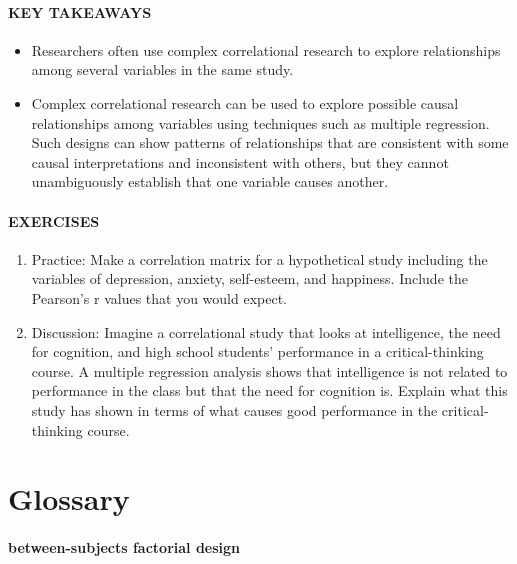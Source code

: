 \documentclass[
]{krantz}
\providecommand{\tightlist}{%
  \setlength{\itemsep}{0pt}\setlength{\parskip}{0pt}}
\begin{document}
\hypertarget{key-takeaways-21}{%
\paragraph*{KEY TAKEAWAYS}\label{key-takeaways-21}}

\begin{itemize}
\tightlist
\item
  Researchers often use complex correlational research to explore relationships among several variables in the same study.
\item
  Complex correlational research can be used to explore possible causal relationships among variables using techniques such as multiple regression. Such designs can show patterns of relationships that are consistent with some causal interpretations and inconsistent with others, but they cannot unambiguously establish that one variable causes another.
\end{itemize}

\hypertarget{exercises-19}{%
\paragraph*{EXERCISES}\label{exercises-19}}

\begin{enumerate}
\def\labelenumi{\arabic{enumi}.}
\tightlist
\item
  Practice: Make a correlation matrix for a hypothetical study including the variables of depression, anxiety, self-esteem, and happiness. Include the Pearson's r values that you would expect.
\item
  Discussion: Imagine a correlational study that looks at intelligence, the need for cognition, and high school students' performance in a critical-thinking course. A multiple regression analysis shows that intelligence is not related to performance in the class but that the need for cognition is. Explain what this study has shown in terms of what causes good performance in the critical-thinking course.
\end{enumerate}

\hypertarget{glossary-7}{%
\section{Glossary}\label{glossary-7}}

\hypertarget{between-subjects-factorial-design}{%
\paragraph*{between-subjects factorial design}\label{between-subjects-factorial-design}}
\end{document}
